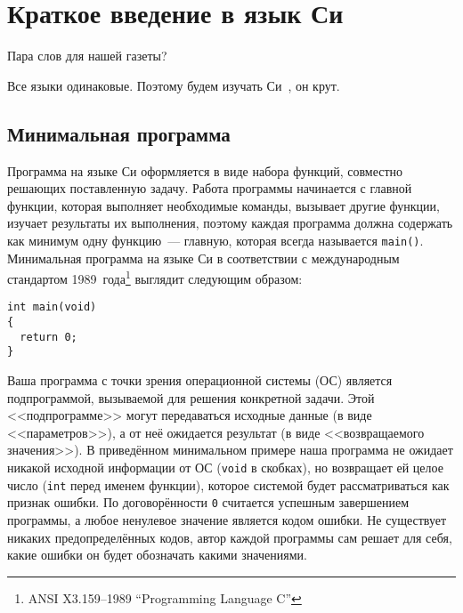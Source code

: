 \chapter{Краткое введение в язык Си}

Пара слов для нашей газеты?

Все языки одинаковые. Поэтому будем изучать Си~\cite{podbelsky2015kurs}, он крут.


\section{Минимальная программа}

Программа на языке Си оформляется в виде набора функций, совместно решающих
поставленную задачу. Работа программы начинается с главной функции, которая
выполняет необходимые команды, вызывает другие функции, изучает результаты их
выполнения, поэтому каждая программа должна содержать как минимум одну
функцию~--- главную, которая всегда называется \texttt{main()}. Минимальная
программа на языке Си в соответствии с международным стандартом
1989~года\footnote{ANSI X3.159--1989 ``Programming Language C''} выглядит
следующим образом:

\begin{verbatim}
int main(void)
{
  return 0;
}
\end{verbatim}

Ваша программа с точки зрения операционной системы (ОС) является
подпрограммой, вызываемой для решения конкретной задачи. Этой <<подпрограмме>>
могут передаваться исходные данные (в виде <<параметров>>), а от неё ожидается
результат (в виде <<возвращаемого значения>>). В приведённом минимальном
примере наша программа не ожидает никакой исходной информации от ОС
(\texttt{void} в скобках), но возвращает ей целое число (\texttt{int} перед
именем функции), которое системой будет рассматриваться как признак ошибки. По
договорённости \texttt{0} считается успешным завершением программы, а любое
ненулевое значение является кодом ошибки. Не существует никаких
предопределённых кодов, автор каждой программы сам решает для себя, какие
ошибки он будет обозначать какими значениями.



